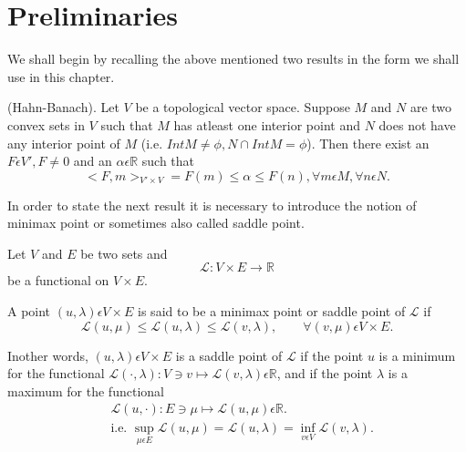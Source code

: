 \section{Preliminaries}\label{chap5-sec1}
We shall begin by recalling the above mentioned two results in the
form we shall use in this chapter. 

\begin{theorem}\label{chap5-thm1.1}
(Hahn-Banach). Let $V$ be a topological vector space. Suppose $M$ and
  $N$ are two convex sets in $V$ such that $M$ has atleast one
  interior point and $N$ does not have any interior point of $M$
  (i.e. $Int M \neq \phi, N \cap Int M = \phi$). Then there exist an
  $F \epsilon V', F \neq 0$ and an $\alpha \epsilon \mathbb{R}$ such
  that 
\begin{equation*}
<F, m >_{V' \times V} = F(m) \leq \alpha \leq F(n), \forall m \epsilon
M, \forall n \epsilon  N.\tag{1.1}\label{chap5-eq1.1} 
\end{equation*}
\end{theorem}

In order to state the next result it is necessary to introduce the
notion of minimax point or sometimes also called saddle point. 

Let $V$ and $E$ be two sets and
$$
\mathscr{L} : V \times E \to \mathbb{R}
$$
be a functional on $V \times E$.

\begin{defi*}
A point $(u, \lambda) \epsilon V \times E$ is said to be a minimax point or saddle point of $\mathscr{L}$ if
\begin{equation*}
\mathscr{L} (u, \mu) \leq \mathscr{L} (u, \lambda) \leq \mathscr{L} (v, \lambda), \qquad\forall(v, \mu) \epsilon V \times E.\tag{1.2}\label{chap5-eq1.2}
\end{equation*}
\end{defi*}

In\pageoriginale other words, $(u, \lambda) \epsilon V \times E$ is a saddle point of $\mathscr{L}$ if the point $u$ is a minimum for the functional $\mathscr{L} (\cdot , \lambda) : V \ni v \mapsto \mathscr{L} (v, \lambda) \epsilon \mathbb{R}$, and if the point $\lambda$ is a maximum for the functional
\begin{align*}
& \mathscr{L} (u, \cdot) : E \ni \mu \mapsto \mathscr{L} (u, \mu) \epsilon \mathbb{R}.\\
& \text{i.e. } \sup_{\mu \epsilon E} \mathscr{L} (u, \mu) = \mathscr{L}(u, \lambda) = \inf_{v \epsilon V} \mathscr{L} (v, \lambda).
\end{align*}

